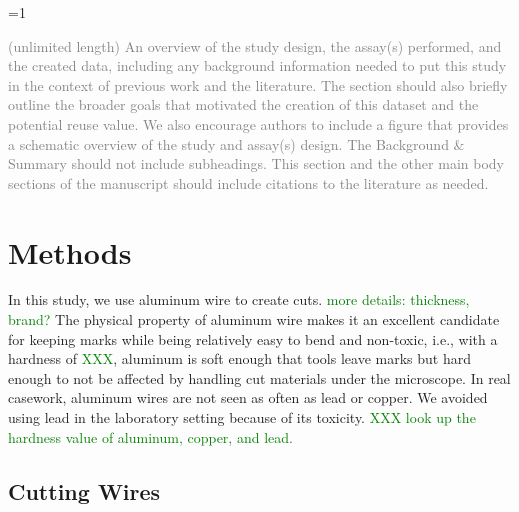 \documentclass[fleqn,10pt]{wlscirep}
\newcommand{\hh}[1]{{\textcolor{Green}{#1}}}
\newcommand{\ifinstruction}{0} %
\begin{document}
\ifnum \ifinstruction=1

\textcolor{gray}{(unlimited length) An overview of the study design, the assay(s) performed, and the created data, including any background information needed to put this study in the context of previous work and the literature. The section should also briefly outline the broader goals that motivated the creation of this dataset and the potential reuse value. We also encourage authors to include a figure that provides a schematic overview of the study and assay(s) design. The Background \& Summary should not include subheadings. This section and the other main body sections of the manuscript should include citations to the literature as needed.}
\fi

\section*{Methods}\label{sec-methods}

In this study, we use aluminum wire to create cuts.
\hh{more details: thickness, brand?} The physical property of aluminum
wire makes it an excellent candidate for keeping marks while being
relatively easy to bend and non-toxic, i.e., with a hardness of
\hh{XXX}, aluminum is soft enough that tools leave marks but hard enough
to not be affected by handling cut materials under the microscope. In
real casework, aluminum wires are not seen as often as lead or copper.
We avoided using lead in the laboratory setting because of its toxicity.
\hh{XXX look up the hardness value of aluminum, copper, and lead.}

\subsection*{Cutting Wires}\label{sec-cutting-wires}
\end{document}
